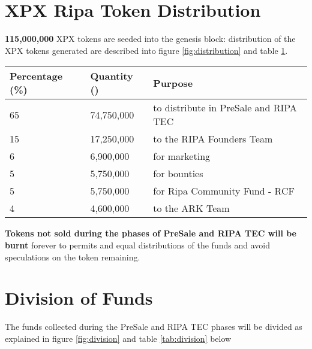 \documentclass[11pt,fleqn,oneside]{book} %
\begin{document}
\section{XPX Ripa Token Distribution}
\textbf{115,000,000} XPX tokens are seeded into the genesis block: distribution of the XPX tokens generated are described into
figure \ref{fig:distribution} and table \ref{tab:distribution}.

\vspace{5mm}
	\label{fig:distribution}

\vspace{5mm}
\begin{table}[H]
	\centering
	\begin{tabular}{l l l}
		\toprule
		\textbf{Percentage (\%)} & \textbf{Quantity (\PHP)} & \textbf{Purpose} \\
		\midrule
		65		& 74,750,000	& to distribute in PreSale and RIPA TEC	\\
		15      & 17,250,000	& to the RIPA Founders Team	\\
		6       & 6,900,000		& for marketing	\\
		5       & 5,750,000 	& for bounties	\\
		5       & 5,750,000		& for Ripa Community Fund - RCF	\\
		4       & 4,600,000		& to the ARK Team	\\
		\bottomrule
	\end{tabular}
	\label{tab:distribution}
\end{table}

\vspace{5mm}
\textbf{Tokens not sold during the phases of PreSale and RIPA TEC will be burnt} forever to permits and equal distributions 
of the funds and avoid speculations on the token remaining.

\section{Division of Funds}
The funds collected during the PreSale and RIPA TEC phases will be divided as explained in figure \ref{fig:division} and 
table \ref{tab:division} below
\end{document}

